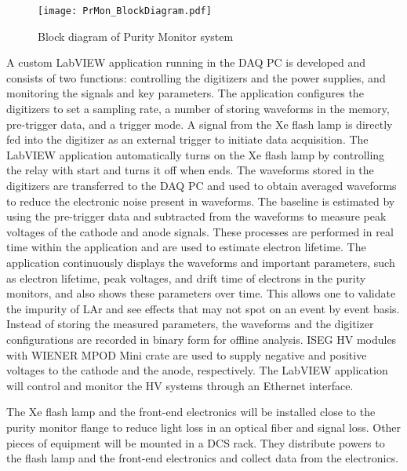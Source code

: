 \begin{figure}[h]
	\centering
	\texttt{[image: PrMon\_BlockDiagram.pdf]}
	\caption{Block diagram of Purity Monitor system}
	\label{fig:diagram}
\end{figure}

A custom LabVIEW application running in the DAQ PC is developed and consists of two functions: controlling the digitizers and the power supplies, and monitoring the signals and key parameters. The application configures the digitizers to set a sampling rate, a number of storing waveforms in the memory, pre-trigger data, and a trigger mode. A signal from the Xe flash lamp is directly fed into the digitizer as an external trigger to initiate data acquisition. The LabVIEW application automatically turns on the Xe flash lamp by controlling the relay with start and turns it off when ends. The waveforms stored in the digitizers are transferred to the DAQ PC and used to obtain averaged waveforms to reduce the electronic noise present in waveforms. The baseline is estimated by using the pre-trigger data and subtracted from the waveforms to measure peak voltages of the cathode and anode signals. These processes are performed in real time within the application and are used to estimate electron lifetime. The application continuously displays the waveforms and important parameters, such as electron lifetime, peak voltages, and drift time of electrons in the purity monitors, and also shows these parameters over time. This allows one to validate the impurity of LAr and see effects that may not spot on an event by event basis. Instead of storing the measured parameters, the waveforms and the digitizer configurations are recorded in binary form for offline analysis. ISEG HV modules with WIENER MPOD Mini crate are used to supply negative and positive voltages to the cathode and the anode, respectively. The LabVIEW application will control and monitor the HV systems through an Ethernet interface.  

The Xe flash lamp and the front-end electronics will be installed close to the purity monitor flange to reduce light loss in an optical fiber and signal loss. Other pieces of equipment will be mounted in a DCS rack. They distribute powers to the flash lamp and the front-end electronics and collect data from the electronics.




